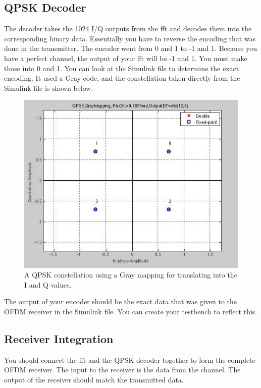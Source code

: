 \subsection{QPSK Decoder}
The decoder takes the 1024 I/Q outputs from the \gls{fft} and decodes them into the corresponding binary data. Essentially you have to reverse the encoding that was done in the transmitter. The encoder went from 0 and 1 to -1 and 1. Because you have a perfect channel, the output of your \gls{fft} will be -1 and 1. You must make those into 0 and 1. You can look at the Simulink file to determine the exact encoding. It used a Gray code, and the constellation taken directly from the Simulink file is shown below.

\begin{figure}
\centering
\includegraphics[width=5.5in]{images/qpsk_fft}
\caption{A QPSK constellation using a Gray mapping for translating into the I and Q values.}
\label{fig:qpsk_fft}
\end{figure}

The output of your encoder should be the exact data that was given to the OFDM receiver in the Simulink file. You can create your testbench to reflect this.

\subsection{Receiver Integration}
You should connect the \gls{fft} and the QPSK decoder together to form the complete OFDM receiver. The input to the receiver is the data from the channel. The output of the receiver should match the transmitted data.

